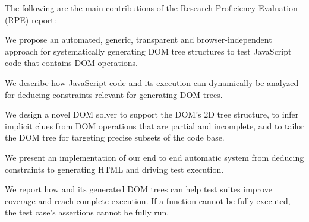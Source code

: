 The following are the main contributions of the Research Proficiency Evaluation (RPE) report:
\begin {compactitem}
\item We propose an automated, generic, transparent and browser-independent approach for systematically generating DOM tree structures to test JavaScript code that contains DOM operations.
\item We describe how JavaScript code and its execution can dynamically be analyzed for deducing constraints relevant for generating DOM trees.
\item We design a novel DOM solver to support the DOM's 2D tree structure, to infer implicit clues from DOM operations that are partial and incomplete, and to tailor the DOM tree for targeting precise subsets of the code base.
\item We present an implementation of our end to end automatic system from deducing constraints to generating HTML and driving test execution.
\item We report how \tool and its generated DOM trees can help test suites improve coverage and reach complete execution.  If a function cannot be fully executed, the test case's assertions cannot be fully run.  
\end {compactitem}






\begin{comment}

1. JavaScript interacts with the DOM and DOM-related \javascript faults are prevalent 
2. Unit testing JavaScript functions required the DOM as input, not any DOM but the DOM in a specific structure
3. Other techniques only focus on input values to functions and ignore the DOM
4. Our technique addresses this important issue by...
5. Our contributions are... our results show that...

\end{comment}
